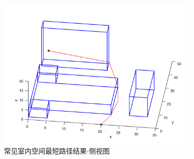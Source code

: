 \begin{figure}[!htb]
    \centering
    \includegraphics[width=10cm]{figures/test_common_situation_out_lean.png}
    \caption{常见室内空间最短路径结果-侧视图}
    \label{fig:test_common_situation_out_lean}
\end{figure}

\FloatBarrier
